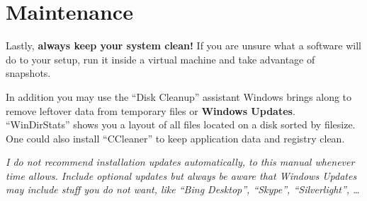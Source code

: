 \documentclass{itsarticle}
\begin{document}
\section{Maintenance}
\label{sec:maintenance}

Lastly, \textbf{always keep your system clean!} If you are unsure what a
software will do to your setup, run it inside a virtual machine and take
advantage of snapshots.

In addition you may use the ``Disk Cleanup'' assistant Windows brings along to
remove leftover data from temporary files or \textbf{Windows Updates}.
``WinDirStats'' shows you a layout of all files located on a disk sorted by
filesize. One could also install ``CCleaner'' to keep application data and
registry clean.

\textit{I do not recommend installation updates automatically, to this manual
whenever time allows. Include optional updates but always be aware that Windows
Updates may include stuff you do not want, like ``Bing Desktop'', ``Skype'',
``Silverlight'', \ldots}
\end{document}
